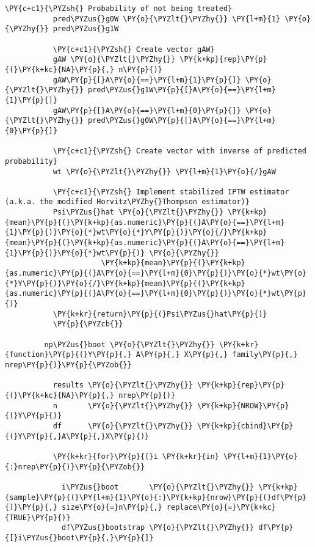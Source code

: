 \begin{Verbatim}[commandchars=\\\{\}]
           \PY{c+c1}{\PYZsh{} Probability of not being treated}
           pred\PYZus{}g0W \PY{o}{\PYZlt{}\PYZhy{}} \PY{l+m}{1} \PY{o}{\PYZhy{}} pred\PYZus{}g1W
             
           \PY{c+c1}{\PYZsh{} Create vector gAW}
           gAW \PY{o}{\PYZlt{}\PYZhy{}} \PY{k+kp}{rep}\PY{p}{(}\PY{k+kc}{NA}\PY{p}{,} n\PY{p}{)}
           gAW\PY{p}{[}A\PY{o}{==}\PY{l+m}{1}\PY{p}{]} \PY{o}{\PYZlt{}\PYZhy{}} pred\PYZus{}g1W\PY{p}{[}A\PY{o}{==}\PY{l+m}{1}\PY{p}{]}
           gAW\PY{p}{[}A\PY{o}{==}\PY{l+m}{0}\PY{p}{]} \PY{o}{\PYZlt{}\PYZhy{}} pred\PYZus{}g0W\PY{p}{[}A\PY{o}{==}\PY{l+m}{0}\PY{p}{]}
             
           \PY{c+c1}{\PYZsh{} Create vector with inverse of predicted probability}
           wt \PY{o}{\PYZlt{}\PYZhy{}} \PY{l+m}{1}\PY{o}{/}gAW
             
           \PY{c+c1}{\PYZsh{} Implement stabilized IPTW estimator (a.k.a. the modified Horvitz\PYZhy{}Thompson estimator)}
           Psi\PYZus{}hat \PY{o}{\PYZlt{}\PYZhy{}} \PY{k+kp}{mean}\PY{p}{(}\PY{k+kp}{as.numeric}\PY{p}{(}A\PY{o}{==}\PY{l+m}{1}\PY{p}{)}\PY{o}{*}wt\PY{o}{*}Y\PY{p}{)}\PY{o}{/}\PY{k+kp}{mean}\PY{p}{(}\PY{k+kp}{as.numeric}\PY{p}{(}A\PY{o}{==}\PY{l+m}{1}\PY{p}{)}\PY{o}{*}wt\PY{p}{)} \PY{o}{\PYZhy{}}
                      \PY{k+kp}{mean}\PY{p}{(}\PY{k+kp}{as.numeric}\PY{p}{(}A\PY{o}{==}\PY{l+m}{0}\PY{p}{)}\PY{o}{*}wt\PY{o}{*}Y\PY{p}{)}\PY{o}{/}\PY{k+kp}{mean}\PY{p}{(}\PY{k+kp}{as.numeric}\PY{p}{(}A\PY{o}{==}\PY{l+m}{0}\PY{p}{)}\PY{o}{*}wt\PY{p}{)}
           \PY{k+kr}{return}\PY{p}{(}Psi\PYZus{}hat\PY{p}{)}
           \PY{p}{\PYZcb{}}
         
         np\PYZus{}boot \PY{o}{\PYZlt{}\PYZhy{}} \PY{k+kr}{function}\PY{p}{(}Y\PY{p}{,} A\PY{p}{,} X\PY{p}{,} family\PY{p}{,} nrep\PY{p}{)}\PY{p}{\PYZob{}}
             
           results \PY{o}{\PYZlt{}\PYZhy{}} \PY{k+kp}{rep}\PY{p}{(}\PY{k+kc}{NA}\PY{p}{,} nrep\PY{p}{)}
           n       \PY{o}{\PYZlt{}\PYZhy{}} \PY{k+kp}{NROW}\PY{p}{(}Y\PY{p}{)}
           df      \PY{o}{\PYZlt{}\PYZhy{}} \PY{k+kp}{cbind}\PY{p}{(}Y\PY{p}{,}A\PY{p}{,}X\PY{p}{)}
             
           \PY{k+kr}{for}\PY{p}{(}i \PY{k+kr}{in} \PY{l+m}{1}\PY{o}{:}nrep\PY{p}{)}\PY{p}{\PYZob{}}
               
             i\PYZus{}boot       \PY{o}{\PYZlt{}\PYZhy{}} \PY{k+kp}{sample}\PY{p}{(}\PY{l+m}{1}\PY{o}{:}\PY{k+kp}{nrow}\PY{p}{(}df\PY{p}{)}\PY{p}{,} size\PY{o}{=}n\PY{p}{,} replace\PY{o}{=}\PY{k+kc}{TRUE}\PY{p}{)}
             df\PYZus{}bootstrap \PY{o}{\PYZlt{}\PYZhy{}} df\PY{p}{[}i\PYZus{}boot\PY{p}{,}\PY{p}{]}
               

\end{Verbatim}
